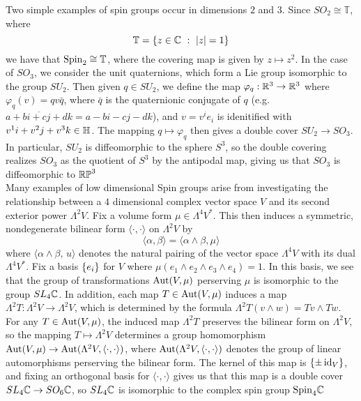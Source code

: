 Two simple examples of spin groups occur in dimensions $2$ and $3$.
Since $SO_2 \cong \mathbb{T}$, where
\[
\mathbb{T} = \left\lbrace z \in \mathbb{C} ~:~ |z| = 1 \right\rbrace
\]
we have that $\mathrm{Spin}_2 \cong \mathbb{T}$, where the covering map is given
by $z \mapsto z^2$. In the case of $SO_3$, we consider the unit quaternions,
which form a Lie group isomorphic to the group $SU_2$. Then given $q \in SU_2$, we define
the map $\varphi_q : \mathbb{R}^3 \to \mathbb{R}^3$ where $\varphi_q(v) = qv\bar{q}$, where
$\bar{q}$ is the quaternionic conjugate of $q$ (e.g. $\overline{a + bi + cj +dk}
= a -bi -cj -dk$), and $v = v^ie_i$ is idenitified with $v^1 i + v^2j + v^3k \in \mathbb{H}$.
The mapping $q \mapsto \varphi_q$ then gives a double cover $SU_2 \to SO_3$.
In particular, $SU_2$ is diffeomorphic to the sphere $S^3$, so the double
covering realizes $SO_3$ as the quotient of $S^3$ by the antipodal map,
giving us that $SO_3$ is diffeomorphic to $\mathbb{RP}^3$ \\

Many examples of low dimensional Spin groups arise from investigating the
relationship between a $4$ dimensional complex vector space $V$ and its second
exterior power $\Lambda^2V$. Fix a volume form $\mu \in \Lambda^4V^*$. This then
induces a symmetric, nondegenerate bilinear form $\langle \cdot,\cdot \rangle$
on $\Lambda^2V$ by
\[
\langle \alpha,\beta \rangle = \langle \alpha \wedge \beta, \mu \rangle
\]
where $\langle \alpha \wedge \beta, \,u \rangle$ denotes the natural pairing of
the vector space $\Lambda^4V$ with its dual $\Lambda^4V^*$. Fix a basis
$\left\lbrace e_i \right\rbrace$ for $V$ where $\mu(e_1 \wedge e_2 \wedge e_3 \wedge e_4) = 1$. In this basis,
we see that the group of transformations $\operatorname{Aut}(V, \mu)$ perserving $\mu$ is
isomorphic to the group $SL_4\mathbb{C}$. In addition, each map $T \in \operatorname{Aut}(V, \mu)$
induces a map $\Lambda^2 T : \Lambda^2V \to \Lambda^2V$, which is determined
by the formula $\Lambda^2 T(v \wedge w) = Tv \wedge Tw$. For any $T \in \operatorname{Aut}(V, \mu)$,
the induced map $\Lambda^2 T$ preserves the bilinear form on $\Lambda^2V$, so the
mapping $T \mapsto \Lambda^2V$ determines a group homomorphism
$\operatorname{Aut}(V, \mu) \to \operatorname{Aut}(\Lambda^2V, \langle \cdot,\cdot \rangle)$, where
$\operatorname{Aut}(\Lambda^2V,\langle\cdot,\cdot\rangle)$ denotes the group of linear automorphisms
perserving the bilinear form. The kernel of this map is $\left\lbrace \pm \operatorname{id}_V \right\rbrace$, and fixing
an orthogonal basis for $\langle\cdot,\cdot\rangle$ gives us that this map is
a double cover $SL_4\mathbb{C} \to SO_6\mathbb{C}$, so $SL_4\mathbb{C}$ is isomorphic to the
complex spin group $\mathrm{Spin}_4\mathbb{C}$ \\

